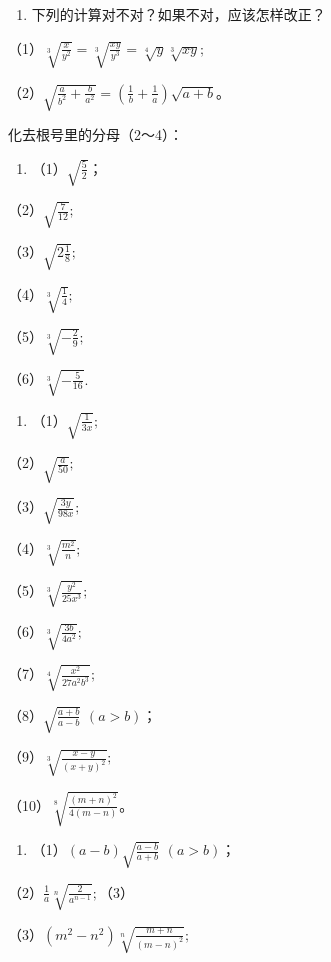 \begin{enumerate}
\item
  下列的计算对不对？如果不对，应该怎样改正？
\end{enumerate}

（1）\(\sqrt[3]{\frac{x}{y^2}} = \sqrt[3]{\frac{xy}{y^3}} = \sqrt[4]{y}\sqrt[3]{xy};\)

（2）\(\sqrt{\frac{a}{b^2} + \frac{b}{a^2}} = \left(\frac{1}{b} + \frac{1}{a}\right)\sqrt{a + b}\)。

化去根号里的分母（2～4）：

\begin{enumerate}[start=2]
\item
  （1）\(\sqrt{\frac{5}{2}}\)；
\end{enumerate}

（2）\(\sqrt{\frac{7}{12}};\)

（3）\(\sqrt{2\frac{1}{8}};\)

（4）\(\sqrt[3]{\frac{1}{4}};\)

（5）\(\sqrt[3]{-\frac{2}{9}};\)

（6）\(\sqrt[3]{-\frac{5}{16}}.\)

\begin{enumerate}[start=3]
\item
  （1）\(\sqrt{\frac{1}{3x}};\)
\end{enumerate}

（2）\(\sqrt{\frac{a}{50}};\)

（3）\(\sqrt{\frac{3y}{98x}};\)

（4）\(\sqrt[3]{\frac{m^2}{n}};\)

（5）\(\sqrt[3]{\frac{y^2}{25x^3}};\)

（6）\(\sqrt[3]{\frac{3b}{4a^2}};\)

（7）\(\sqrt[4]{\frac{x^2}{27a^2b^3}};\)

（8）\(\sqrt{\frac{a + b}{a - b}}\) \((a > b)\)；

（9）\(\sqrt[3]{\frac{x - y}{(x + y)^2}};\)

（10）\(\sqrt[8]{\frac{(m + n)^2}{4(m - n)}}\)。

\begin{enumerate}[start=4]
\item
  （1）\((a - b)\sqrt{\frac{a - b}{a + b}}\) \((a > b)\)；
\end{enumerate}

（2）\(\frac{1}{a}\sqrt[n]{\frac{2}{a^{n-1}}};\)（3）

（3）\((m^2 - n^2)\sqrt[n]{\frac{m + n}{(m - n)^2}};\)

